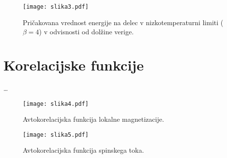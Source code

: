 \documentclass[a4paper]{article}
\begin{document}
    \begin{figure}
        \centering
        \texttt{[image: slika3.pdf]}
        \caption{Pričakovana vrednost energije na delec v nizkotemperaturni limiti ($\beta = 4$) v odvisnosti od
        dolžine verige.}
        \label{slika3}
    \end{figure}

    \section{Korelacijske funkcije}

    \ldots

    \begin{figure}
        \centering
        \texttt{[image: slika4.pdf]}
        \caption{Avtokorelacijska funkcija lokalne magnetizacije.}
        \label{slika4}
    \end{figure}

    \begin{figure}
        \centering
        \texttt{[image: slika5.pdf]}
        \caption{Avtokorelacijska funkcija spinskega toka.}
        \label{slika5}
    \end{figure}
\end{document}

